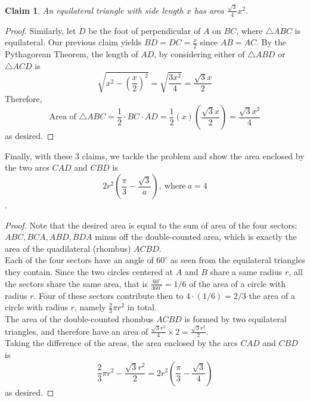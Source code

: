 \documentclass{article}
\newtheorem*{claim}{Claim}
\begin{document}
\begin{claim}
  An equilateral triangle with side length $x$ has area $\frac{\sqrt{3}}{4}x^{2}$.
\end{claim}
\begin{center}
\end{center}
\begin{proof}
  Similarly, let $D$ be the foot of perpendicular of $A$ on $BC$, where $\triangle ABC$
  is equilateral. Our previous claim yields $BD=DC=\frac{x}{2}$ since $AB=AC$.
  By the Pythagorean Theorem, the length of $AD$, by considering either of
  $\triangle ABD$ or $\triangle ACD$ is
  \[
    \sqrt{x^{2} - (\frac{x}{2})^{2}} = \sqrt{\frac{3x^{2}}{4}} = \frac{\sqrt{3}x}{2}
  \]
  Therefore,
  \[
    \text{Area of }\triangle ABC = \frac{1}{2}\cdot BC\cdot AD = \frac{1}{2}(x)(\frac{\sqrt{3}x}{2}) = \frac{\sqrt{3}x^{2}}{4}
  \] as desired.
\end{proof}
Finally, with these 3 claims, we tackle the problem and show the area enclosed
by the two arcs $CAD$ and $CBD$ is
\[2r^{2}(\frac{\pi}{3} - \frac{\sqrt{3}}{a}),\ \text{where}\ a=4 \].
\begin{proof}
  Note that the desired area is equal to the sum of area of the four sectors:
  $ABC, BCA, ABD, BDA$ minus off the double-counted area, which is exactly the
  area of the quadilateral (rhombus) $ACBD$.\\
  Each of the four sectors have an angle of $60^{\circ}$ as seen from the
  equilateral triangles they contain. Since the two circles centered at $A$ and
  $B$ share a same radius $r$, all the sectors share the same area, that is
  $\frac{60^{\circ}}{360^{\circ}} = 1/6$ of the area of a circle with radius $r$. Four
  of these sectors contribute then to $4\cdot(1/6) = 2/3$ the area of a circle with
  radius $r$, namely $\frac{2}{3}\pi r^{2}$ in total.\\
  The area of the double-counted rhombus $ACBD$ is formed by two equilateral
  triangles, and therefore have an area of
  $\frac{\sqrt{3}r^{2}}{4}\times 2=\frac{\sqrt{3}r^{2}}{2}$.\\
  Taking the difference of the areas, the area enclosed by the arcs $CAD$ and
  $CBD$ is
  \[ \frac{2}{3}\pi r^{2}-\frac{\sqrt{3}r^{2}}{2}=2r^{2}(\frac{\pi}{3}-\frac{\sqrt{3}}{4})\]
  as desired.
\end{proof}                                                
\end{document}
